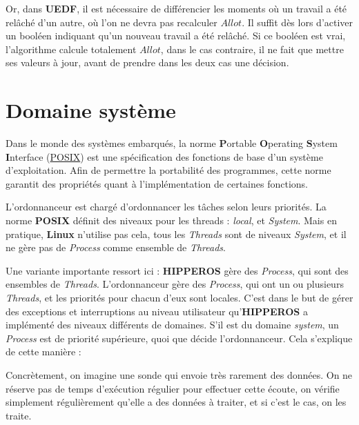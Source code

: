 		Or, dans \textbf{UEDF}, il est nécessaire de différencier les moments où un travail a été relâché 
		d'un autre, où l'on ne devra pas recalculer $Allot$. Il suffit dès lors d'activer un 
		booléen indiquant qu'un nouveau travail a été relâché. Si ce booléen est vrai, 
		l'algorithme calcule totalement $Allot$, dans le cas contraire, il ne fait que mettre ses valeurs à 
		jour, avant de prendre dans les deux cas une décision.\newline
	
	\section{Domaine système}
	Dans le monde des systèmes embarqués, la norme \textbf{P}ortable \textbf{O}perating \textbf{S}ystem \textbf{I}nterface (\hyperref{http://www-sop.inria.fr/chir/personnel/arias/NArgimoge/Document/node19.html}{POSIX}{POSIX}{POSIX})	
	est une spécification des fonctions de base d'un système d'exploitation. Afin de permettre la portabilité des programmes, 
	cette norme garantit des propriétés quant à l'implémentation de certaines fonctions. \newline	
	
	L'ordonnanceur est chargé d'ordonnancer les tâches selon leurs priorités. 
	La norme \textbf{POSIX} définit des niveaux pour les threads : \textit{local}, et \textit{System}. 
	Mais en pratique, \textbf{Linux} n'utilise pas cela, tous les \textit{Threads} sont 
	de niveaux \textit{System}, et il ne gère pas de \textit{Process} comme ensemble de \textit{Threads}.\newline

	Une variante importante ressort ici : \textbf{HIPPEROS} gère des \textit{Process}, 
	qui sont des ensembles de \textit{Threads}. L'ordonnanceur gère des \textit{Process}, qui ont un ou plusieurs \textit{Threads}, 
	et les priorités pour chacun d'eux sont locales.
	C'est dans le but de gérer des exceptions et interruptions au niveau utilisateur qu'\textbf{HIPPEROS } a implémenté 
	des niveaux différents de domaines. S'il est du domaine \textit{system}, un \textit{Process }est de priorité supérieure, quoi que décide 
	l'ordonnanceur. Cela s'explique de cette manière :\newline

	Concrètement, on imagine une sonde qui envoie très rarement des données. On ne réserve 
	pas de temps d'exécution régulier pour effectuer cette écoute, 
	on vérifie simplement régulièrement qu'elle a des données à traiter, et si c'est le cas, on les traite.\newline
	
